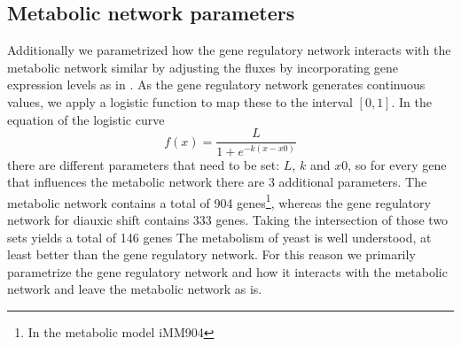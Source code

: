 \subsection{Metabolic network parameters}
Additionally we parametrized how the gene regulatory network interacts with the metabolic network similar by adjusting the fluxes 
by incorporating gene expression levels as in \cite{chandrasekaran2010probabilistic}.
As the gene regulatory network generates continuous values, we apply
a logistic function to map these to the interval $[0,1]$. 
In the equation of the logistic curve 
\begin{equation}
 f(x) = \frac{L}{1+e^{-k(x-x0)}}
\end{equation}
there are different parameters that need to be set: $L$, $k$ and $x0$, so for every gene that influences the metabolic
network there are 3 additional parameters. The metabolic network contains a total of 904 genes\footnote{In the metabolic model iMM904}, whereas the gene regulatory
network for diauxic shift contains 333 genes. Taking the intersection of those two sets yields a total of 146 genes
The metabolism of yeast is well understood, at least better than the gene regulatory network\cite{NEEDED}. For this reason we primarily parametrize the gene regulatory network and how it interacts with the metabolic network
and leave the metabolic network as is.

